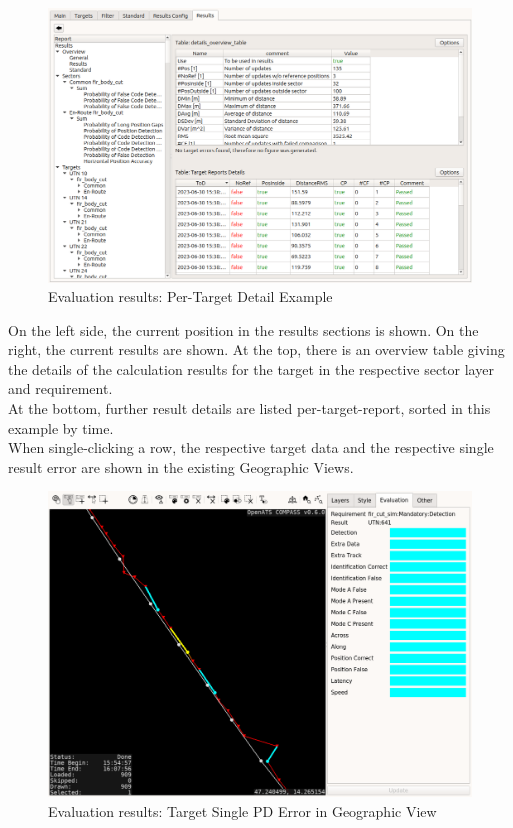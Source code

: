 \begin{figure}[H]
  \hspace*{-2cm}
    \includegraphics[width=18cm,frame]{figures/eval_results_target_example.png}
  \caption{Evaluation results: Per-Target Detail Example}
\end{figure}

On the left side, the current position in the results sections is shown. On the right, the current results are shown. At the top, there is an overview table giving the details of the calculation results for the target in the respective sector layer and requirement. \\

At the bottom, further result details are listed per-target-report, sorted in this example by time. \\

When single-clicking a row, the respective target data and the respective single result error are shown in the existing Geographic Views.

\begin{figure}[H]
  \hspace*{-2.5cm}
    \includegraphics[width=19cm]{figures/eval_results_pd_single_tr_geoview.png}
  \caption{Evaluation results: Target Single PD Error in Geographic View}
\end{figure}



